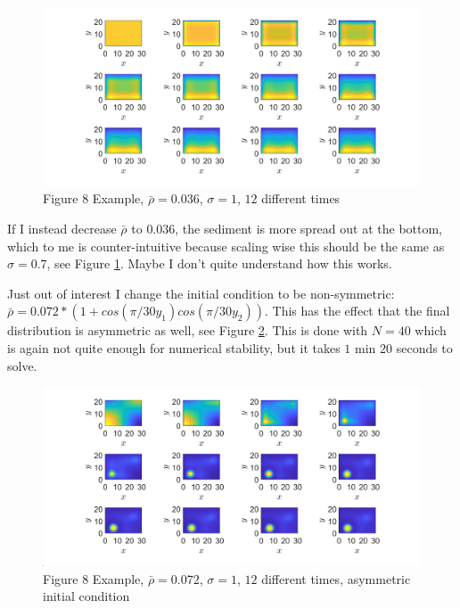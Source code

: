\documentclass[11pt, a4paper]{article}
\theoremstyle{definition}
\begin{document}
	
	\begin{figure}[h]
		\centering
		\includegraphics[scale=0.35]{Ex8F1b.png}
		\caption{Figure 8 Example, $\bar \rho = 0.036$, $\sigma = 1$, $12$ different times} 
		\label{F1b}
	\end{figure}
	If I instead decrease $\bar \rho$  to $0.036$, the sediment is more spread out at the bottom, which to me is counter-intuitive because scaling wise this should be the same as $\sigma = 0.7$, see Figure \ref{F1b}. Maybe I don't quite understand how this works.
	
	Just out of interest I change the initial condition to be non-symmetric: $\bar \rho = 0.072 *(1 + cos(\pi / 30 y_1)cos(\pi / 30 y_2))$. This has the effect that the final distribution is asymmetric as well, see Figure \ref{Fx}. This is done with $N = 40$ which is again not quite enough for numerical stability, but it takes $1$ min $20$ seconds to solve.
	\begin{figure}[h]
		\centering
		\includegraphics[scale=0.4]{Ex8NonSym.png}
		\caption{Figure 8 Example, $\bar \rho = 0.072$, $\sigma = 1$, $12$ different times, asymmetric initial condition} 
		\label{Fx}
	\end{figure}
\end{document}
